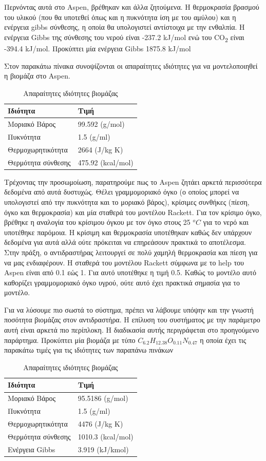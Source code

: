 \documentclass[11pt]{article}
\begin{document}
Περνόντας αυτά στο Aspen, βρέθηκαν και άλλα ζητούμενα. Η θερμοκρασία βρασμού του υλικού (που θα υποτεθεί όπως και η πυκνότητα ίση με του αμύλου) και η ενέργεια gibbs σύνθεσης, η οποία θα υπολογιστεί αντίστοιχα με την ενθαλπία. Η ενέργεια Gibbs της σύνθεσης του νερού είναι -237.2 kJ/mol ενώ του CO\textsubscript{2} είναι -394.4 kJ/mol. Προκύπτει μία ενέργεια Gibbs 1875.8 kJ/mol 

Στον παρακάτω πίνακα συνοψίζονται οι απαραίτητες ιδιότητες για να μοντελοποιηθεί η βιομάζα στο Aspen.
\begin{table}[htbp]
\caption{Απαραίτητες ιδιότητες βιομάζας}
\centering
\begin{tabular}{ll}
Ιδιότητα & Τιμή\\
\hline
Μοριακό Βάρος & 99.592 (g/mol)\\
Πυκνότητα & 1.5 (g/ml)\\
Θερμοχωρητικότητα & 2664 (J/kg K)\\
Θερμότητα σύνθεσης & 475.92 (kcal/mol)\\
\end{tabular}
\end{table}

Τρέχοντας την προσωμοίωση, παρατηρούμε πως το Aspen ζητάει αρκετά περισσότερα δεδομένα από αυτά δυστυχώς. Θέλει γραμμομοριακό όγκο (ο οποίος μπορεί να υπολογιστεί από την πυκνότητα και το μοριακό βάρος), κρίσιμες συνθήκες (πίεση, όγκο και θερμοκρασία) και μία σταθερά του μοντέλου Rackett. Για τον κρίσιμο όγκο, βρέθηκε η αναλογία του κρίσιμου όγκου με τον όγκο στους 25 \(^oC\) για το νερό και υποτέθηκε παρόμοια. Η κρίσιμη και θερμοκρασία υποτέθηκαν καθώς δεν υπάρχουν δεδομένα για αυτά αλλά ούτε πρόκειται να επηρεάσουν πρακτικά το αποτέλεσμα. Στην πράξη, ο αντιδραστήρας λειτουργεί σε πολύ χαμηλή θερμοκρασία και πίεση για να μας ενδιαφέρουν. Η σταθερά του μοντέλου Rackett σύμφωνα με το help του Aspen είναι από 0.1 εώς 1. Για αυτό υποτέθηκε η τιμή 0.5. Καθώς το μοντέλο αυτό καθορίζει γραμμομοριακό όγκο υγρού, ούτε αυτό έχει πρακτικά σημασία για το μοντέλο.

Για να λύσουμε πιο σωστά το σύστημα, πρέπει να λάβουμε υπόψην και την γνωστή ποσότητα βιομάζας στον αντιδραστήρα. Η επίλυση του συστήματος με την παράμετρο αυτή είναι αρκετά πιο περίπλοκη. Η διαδικασία αυτής περιγράφεται στο προηγούμενο παράρτημα. Προκύπτει μία βιομάζα με τύπο \(C_{6.2}H_{12.38}O_{0.11}N_{0.47}\) η οποία έχει τις παρακάτω τιμές για τις ιδιότητες των παραπάνω πινάκων

\pagebreak

\begin{table}[htbp]
\caption{Απαραίτητες ιδιότητες βιομάζας}
\centering
\begin{tabular}{ll}
Ιδιότητα & Τιμή\\
\hline
Μοριακό Βάρος & 95.5186 (g/mol)\\
Πυκνότητα & 1.5 (g/ml)\\
Θερμοχωρητικότητα & 4476 (J/kg K)\\
Θερμότητα σύνθεσης & 1010.3 (kcal/mol)\\
Ενέργεια Gibbs & 3.919 (kJ/kmol)\\
\end{tabular}
\end{table}
\end{document}
